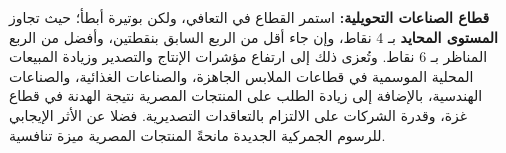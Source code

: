 \textbf{قطاع الصناعات التحويلية:} استمر القطاع في التعافي، ولكن بوتيرة أبطأ؛ حيث تجاوز \textbf{المستوى المحايد} بـ 4 نقاط، وإن جاء أقل من الربع السابق بنقطتين، وأفضل من الربع المناظر بـ 6 نقاط. وتُعزى ذلك إلى ارتفاع مؤشرات الإنتاج والتصدير وزيادة المبيعات المحلية الموسمية في قطاعات الملابس الجاهزة، والصناعات الغذائية، والصناعات الهندسية، بالإضافة إلى زيادة الطلب على المنتجات المصرية نتيجة الهدنة في قطاع غزة، وقدرة الشركات على الالتزام بالتعاقدات التصديرية. فضلا عن الأثر الإيجابي للرسوم الجمركية الجديدة مانحةً المنتجات المصرية ميزة تنافسية.
